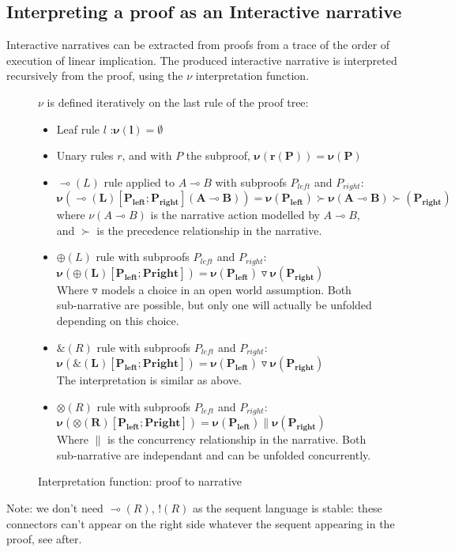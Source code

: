 \documentclass[runningheads,a4paper]{llncs}
\begin{document}
\subsection{Interpreting a proof as an Interactive narrative}
Interactive narratives can be extracted from proofs from a trace of the order of execution of linear implication. The produced interactive narrative is interpreted recursively from the proof, using the $\nu$ interpretation function.
\begin{figure}
$\nu$ is defined iteratively on the last rule of the proof tree:
\begin{itemize}
\item Leaf rule $l$ :$\mathbf{\nu(l) = \emptyset}$
\item Unary rules $r$, and with $P$ the subproof, $\mathbf{\nu(r(P)) = \nu(P)}$
\item $\multimap(L)$ rule applied to $A\multimap B$ with subproofs $P_{left}$ and $P_{right}$:\\
$\mathbf{\nu(\multimap(L)[P_{left};P_{right}](A\multimap B)) = \nu(P_{left}) \succ \nu(A \multimap B) \succ(P_{right})}$\\
where $\nu(A \multimap B)$ is the narrative action modelled by $A \multimap B$, and $\succ$ is the precedence relationship in the narrative.
\item $\oplus (L)$ rule with subproofs $P_{left}$ and $P_{right}$:\\ 
$\mathbf{\nu(\oplus(L)[P_{left};P{right}]) = \nu(P_{left}) \triangledown \nu(P_{right})}$\\ 
Where $\triangledown$ models a choice in an open world assumption. Both sub-narrative are possible, but only one will actually be unfolded depending on this choice.
\item $\& (R)$ rule with subproofs $P_{left}$ and $P_{right}$:\\ 
$\mathbf{\nu(\&(L)[P_{left};P{right}]) = \nu(P_{left}) \triangledown \nu(P_{right})}$\\ 
The interpretation is similar as above.
\item $\otimes (R)$ rule with subproofs $P_{left}$ and $P_{right}$:\\ 
$\mathbf{\nu(\otimes(R)[P_{left};P{right}]) = \nu(P_{left}) \| \nu(P_{right})}$ \\
Where $\|$ is the concurrency relationship in the narrative. Both sub-narrative are independant and can be unfolded concurrently.
\end{itemize}
\caption{Interpretation function: proof to narrative\label{interpretation}}
\end{figure}
Note: we don't need $\multimap (R)$, $! (R)$ as the sequent language is stable: these connectors can't appear on the right side whatever the sequent appearing in the proof, see after.
\end{document}

